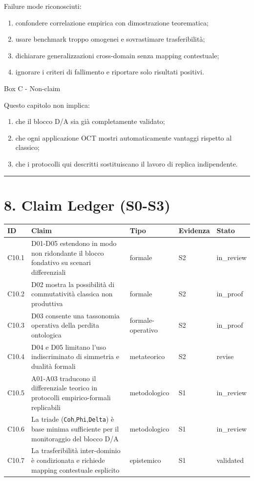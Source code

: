Failure mode riconosciuti:

\begin{enumerate}
\def\labelenumi{\arabic{enumi}.}
\tightlist
\item
  confondere correlazione empirica con dimostrazione teorematica;
\item
  usare benchmark troppo omogenei e sovrastimare trasferibilità;
\item
  dichiarare generalizzazioni cross-domain senza mapping contestuale;
\item
  ignorare i criteri di fallimento e riportare solo risultati positivi.
\end{enumerate}

Box C - Non-claim

Questo capitolo non implica:

\begin{enumerate}
\def\labelenumi{\arabic{enumi}.}
\tightlist
\item
  che il blocco D/A sia già completamente validato;
\item
  che ogni applicazione OCT mostri automaticamente vantaggi rispetto al classico;
\item
  che i protocolli qui descritti sostituiscano il lavoro di replica indipendente.
\end{enumerate}

\begin{center}\rule{0.5\linewidth}{0.5pt}\end{center}

\section{8. Claim Ledger (S0-S3)}

{\def\LTcaptype{none} %
\begin{longtable}[]{@{}lllll@{}}
\toprule\noalign{}
ID & Claim & Tipo & Evidenza & Stato \\
\midrule\noalign{}
\endhead
\bottomrule\noalign{}
\endlastfoot
C10.1 & D01-D05 estendono in modo non ridondante il blocco fondativo su scenari differenziali & formale & S2 & in\_review \\
C10.2 & D02 mostra la possibilità di commutatività classica non produttiva & formale & S2 & in\_proof \\
C10.3 & D03 consente una tassonomia operativa della perdita ontologica & formale-operativo & S2 & in\_proof \\
C10.4 & D04 e D05 limitano l'uso indiscriminato di simmetria e dualità formali & metateorico & S2 & revise \\
C10.5 & A01-A03 traducono il differenziale teorico in protocolli empirico-formali replicabili & metodologico & S1 & in\_review \\
C10.6 & La triade (\texttt{Coh},\texttt{Phi},\texttt{Delta}) è base minima sufficiente per il monitoraggio del blocco D/A & metodologico & S1 & in\_review \\
C10.7 & La trasferibilità inter-dominio è condizionata e richiede mapping contestuale esplicito & epistemico & S1 & validated \\
\end{longtable}
}


